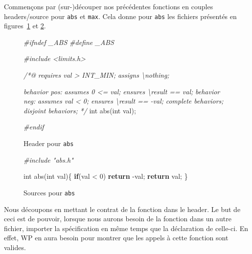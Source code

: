 \documentclass[12pt,francais,]{scrbook}
\newenvironment{Shaded}{}{}
\newcommand{\KeywordTok}[1]{\textcolor[rgb]{0.00,0.44,0.13}{\textbf{{#1}}}}
\newcommand{\DataTypeTok}[1]{\textcolor[rgb]{0.56,0.13,0.00}{{#1}}}
\newcommand{\DecValTok}[1]{\textcolor[rgb]{0.25,0.63,0.44}{{#1}}}
\newcommand{\CommentTok}[1]{\textcolor[rgb]{0.38,0.63,0.69}{\textit{{#1}}}}
\newcommand{\NormalTok}[1]{{#1}}
\begin{document}
Commençons par (sur-)découper nos précédentes fonctions en couples
headers/source pour \texttt{abs} et \texttt{max}. Cela donne pour
\texttt{abs} les fichiers présentés en figures~\ref{fig:3-4-hd} et
\ref{fig:3-4-src}.

\begin{figure}
  \centering
\begin{footnotesize}\begin{Shaded}
\begin{Highlighting}[]
\CommentTok{#ifndef _ABS}
\CommentTok{#define _ABS}

\CommentTok{#include <limits.h>}

\CommentTok{/*@}
\CommentTok{  requires val > INT_MIN;}
\CommentTok{  assigns  \textbackslash{}nothing;}

\CommentTok{  behavior pos:}
\CommentTok{    assumes 0 <= val;}
\CommentTok{    ensures \textbackslash{}result == val;}
\CommentTok{  }
\CommentTok{  behavior neg:}
\CommentTok{    assumes val < 0;}
\CommentTok{    ensures \textbackslash{}result == -val;}
\CommentTok{ }
\CommentTok{  complete behaviors;}
\CommentTok{  disjoint behaviors;}
\CommentTok{*/}
\DataTypeTok{int} \NormalTok{abs(}\DataTypeTok{int} \NormalTok{val);}

\CommentTok{#endif}
\end{Highlighting}
\end{Shaded}\end{footnotesize}
\caption{Header pour \texttt{abs}}
\label{fig:3-4-hd}
\end{figure}

\begin{figure}
  \centering
\begin{footnotesize}\begin{Shaded}
\begin{Highlighting}[]
\CommentTok{#include "abs.h"}

\DataTypeTok{int} \NormalTok{abs(}\DataTypeTok{int} \NormalTok{val)\{}
  \KeywordTok{if}\NormalTok{(val < }\DecValTok{0}\NormalTok{) }\KeywordTok{return} \NormalTok{-val;}
  \KeywordTok{return} \NormalTok{val;}
\NormalTok{\}}
\end{Highlighting}
\end{Shaded}\end{footnotesize}
\caption{Sources pour \texttt{abs}}
\label{fig:3-4-src}
\end{figure}

Nous découpons en mettant le contrat de la fonction dans le header. Le
but de ceci est de pouvoir, lorsque nous aurons besoin de la fonction
dans un autre fichier, importer la spécification en même temps que la
déclaration de celle-ci. En effet, WP en aura besoin pour montrer que
les appels à cette fonction sont valides.
\end{document}
